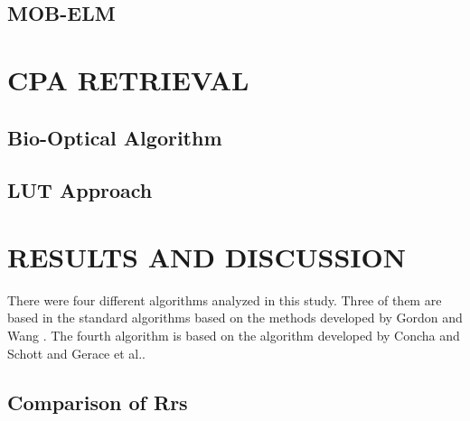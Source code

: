 \documentclass[]{spie}  %
\begin{document}
\subsection{MOB-ELM}


\section{CPA RETRIEVAL}
\subsection{Bio-Optical Algorithm}
\subsection{LUT Approach}
\section{RESULTS AND DISCUSSION}
\label{sec:results}  %

There were four different algorithms analyzed in this study. Three of them are based in the standard algorithms based on the methods developed by Gordon and Wang \cite{Gordon:1994}. The fourth algorithm is based on the algorithm developed by Concha and Schott\cite{Concha2014SPIE} and Gerace et al.\cite{Gerace:2012}.
\subsection{Comparison of Rrs}

\end{document}
